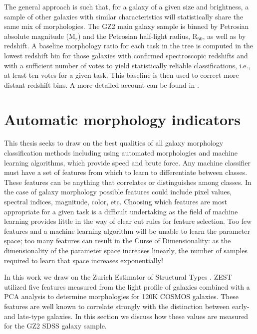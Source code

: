 The general approach is such that, for a galaxy of a given size and brightness, a sample of other galaxies with similar characteristics will statistically share the same mix of morphologies. The GZ2 main galaxy sample is binned by Petrosian absolute magnitude (M$_r$) and the Petrosian half-light radius, R$_{50}$,  as well as by redshift. A baseline morphology ratio for each task in the tree is computed in the lowest redshift bin for those galaxies with confirmed spectroscopic redshifts and with a sufficient number of votes to yield statistically reliable classifications, i.e., at least ten votes for a given task. This baseline is then used to correct more distant redshift bins. A more detailed account can be found in \cite{Willett2013}.


\section{Automatic morphology indicators}

This thesis seeks to draw on the best qualities of all galaxy morphology classification methods including using automated morphologies and machine learning algorithms, which provide speed and brute force. Any machine classifier must have a set of features from which to learn to differentiate between classes. These features can be anything that correlates or distinguishes among classes. In the case of galaxy morphology possible features could include pixel values, spectral indices, magnitude, color, etc. Choosing which features are most appropriate for a given task is a difficult undertaking as the field of machine learning provides little in the way of clear cut rules for feature selection. Too few features and a machine learning algorithm will be unable to learn the parameter space; too many features can result in the Curse of Dimensionality: as the dimensionality of the parameter space increases linearly, the number of samples required to learn that space increases exponentially! 

In this work we draw on the Zurich Estimator of Structural Types \citep[ZEST,][]{Scarlata2007}. ZEST utilized five features measured from the light profile of galaxies combined with a PCA analysis to determine morphologies for 120K COSMOS galaxies. These features are well known to correlate strongly with the distinction between early- and late-type galaxies. In this section we discuss how these values are measured for the GZ2 SDSS galaxy sample. 

